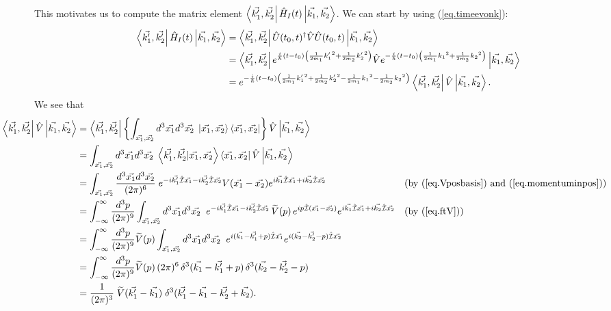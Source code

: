 This motivates us to compute the matrix element \(\left\langle\vec{k_1^\prime}, \vec{k_2^\prime}\right| \hat{H}_I(t)\left|\vec{k_1}, \vec{k_2}\right\rangle\). We can start by using (\ref{eq.timeevonk}):
\begin{align*}
\left\langle\vec{k_1^\prime}, \vec{k_2^\prime}\right| \hat{H}_I(t)\left|\vec{k_1}, \vec{k_2}\right\rangle
&= \left\langle\vec{k_1^\prime}, \vec{k_2^\prime}\right| \hat{U}(t_0, t)^\dagger \hat{V} \hat{U}(t_0, t) \left|\vec{k_1}, \vec{k_2}\right\rangle \nonumber\\
&= \left\langle\vec{k_1^\prime}, \vec{k_2^\prime}\right| e^{\frac{i}{\hbar}\left(t-t_0\right)\left(\frac{1}{2m_1}{{k_1^\prime}}^2 + \frac{1}{2m_2}{{k_2^\prime}}^2\right)} \hat{V} e^{-\frac{i}{\hbar}\left(t-t_0\right)\left(\frac{1}{2m_1}{k_1}^2 + \frac{1}{2m_2}{k_2}^2\right)} \left|\vec{k_1}, \vec{k_2}\right\rangle \nonumber\\
&= e^{-\frac{i}{\hbar}\left(t-t_0\right)\left(\frac{1}{2m_1}{{k_1^\prime}}^2 + \frac{1}{2m_2}{{k_2^\prime}}^2 - \frac{1}{2m_1}{k_1}^2 - \frac{1}{2m_2}{k_2}^2\right)} \left\langle\vec{k_1^\prime}, \vec{k_2^\prime}\right| \hat{V} \left|\vec{k_1}, \vec{k_2}\right\rangle.
\end{align*}
We see that
\begin{align*}
\hspace{-4em}\bra{\vec{k_1^\prime}, \vec{k_2^\prime}} \op{V} \ket{\vec{k_1}, \vec{k_2}} &= \bra{\vec{k_1^\prime}, \vec{k_2^\prime}} \left\{\int_{\vec{x_1}, \vec{x_2}} {d^3 \vec{x_1} d^3 \vec{x_2}\;} \ket{\vec{x_1}, \vec{x_2}}\bra{\vec{x_1}, \vec{x_2}}\right\}\op{V} \ket{\vec{k_1}, \vec{k_2}} \nonumber\\
&= \int_{\vec{x_1}, \vec{x_2}} {d^3 \vec{x_1} d^3 \vec{x_2}\;} \braket{\vec{k_1^\prime}, \vec{k_2^\prime}}{\vec{x_1}, \vec{x_2}}\bra{\vec{x_1}, \vec{x_2}}\op{V} \ket{\vec{k_1}, \vec{k_2}} \nonumber\\
&= \int_{\vec{x_1}, \vec{x_2}} \frac{d^3 \vec{x_1} d^3 \vec{x_2}}{(2\pi)^6}\; e^{-i\vec{k_1^\prime}\id \vec{x_1} - i\vec{k_2^\prime}\id \vec{x_2}}V(\vec{x_1} - \vec{x_2}) e^{i\vec{k_1}\id \vec{x_1} + i\vec{k_2}\id \vec{x_2}} &&\text{(by (\ref{eq.Vposbasis}) and (\ref{eq.momentuminpos}))}\nonumber\\
&= \int_{-\infty}^{\infty} \frac{d^3p}{(2\pi)^9}\int_{\vec{x_1}, \vec{x_2}} {d^3 \vec{x_1} d^3 \vec{x_2}\;\;}e^{-i\vec{k_1^\prime}\id \vec{x_1} - i\vec{k_2^\prime}\id \vec{x_2}}\,\widetilde{V}(p)\,e^{ip\id(\vec{x_1}-\vec{x_2})} e^{i\vec{k_1}\id \vec{x_1} + i\vec{k_2}\id \vec{x_2}}
&&\text{(by (\ref{eq.ftV}))}\nonumber\\
&= \int_{-\infty}^{\infty} \frac{d^3p}{(2\pi)^9}\widetilde{V}(p) \int_{\vec{x_1}, \vec{x_2}} {d^3 \vec{x_1} d^3 \vec{x_2}\;\;}e^{i(\vec{k_1}-\vec{k_1^\prime}+p)\id \vec{x_1}}e^{i(\vec{k_2}-\vec{k_2^\prime}-p)\id \vec{x_2}}\nonumber\\
&= \int_{-\infty}^{\infty} \frac{d^3p}{(2\pi)^9}\widetilde{V}(p) \,(2\pi)^6\,\delta^3(\vec{k_1}-\vec{k_1^\prime}+p)\,\delta^3(\vec{k_2}-\vec{k_2^\prime}-p)\nonumber\\
&= \frac{1}{(2\pi)^3}\;\widetilde{V}(\vec{k_1^\prime}-\vec{k_1}) \;\delta^3(\vec{k_1^\prime}-\vec{k_1}-\vec{k_2^\prime}+\vec{k_2}).
\end{align*}
